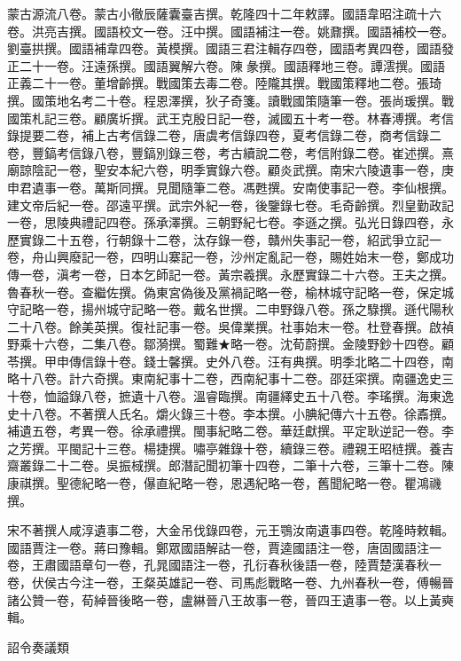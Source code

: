 \begin{pinyinscope}
蒙古源流八卷。蒙古小徹辰薩囊臺吉撰。乾隆四十二年敕譯。國語韋昭注疏十六卷。洪亮吉撰。國語校文一卷。汪中撰。國語補注一卷。姚鼐撰。國語補校一卷。劉臺拱撰。國語補韋四卷。黃模撰。國語三君注輯存四卷，國語考異四卷，國語發正二十一卷。汪遠孫撰。國語翼解六卷。陳彖撰。國語釋地三卷。譚澐撰。國語正義二十一卷。董增齡撰。戰國策去毒二卷。陸隴其撰。戰國策釋地二卷。張琦撰。國策地名考二十卷。程恩澤撰，狄子奇箋。讀戰國策隨筆一卷。張尚瑗撰。戰國策札記三卷。顧廣圻撰。武王克殷日記一卷，滅國五十考一卷。林春溥撰。考信錄提要二卷，補上古考信錄二卷，唐虞考信錄四卷，夏考信錄二卷，商考信錄二卷，豐鎬考信錄八卷，豐鎬別錄三卷，考古續說二卷，考信附錄二卷。崔述撰。熹廟諒陰記一卷，聖安本紀六卷，明季實錄六卷。顧炎武撰。南宋六陵遺事一卷，庚申君遺事一卷。萬斯同撰。見聞隨筆二卷。馮甦撰。安南使事記一卷。李仙根撰。建文帝后紀一卷。邵遠平撰。武宗外紀一卷，後鑒錄七卷。毛奇齡撰。烈皇勤政記一卷，思陵典禮記四卷。孫承澤撰。三朝野紀七卷。李遜之撰。弘光日錄四卷，永歷實錄二十五卷，行朝錄十二卷，汰存錄一卷，贛州失事記一卷，紹武爭立記一卷，舟山興廢記一卷，四明山寨記一卷，沙州定亂記一卷，賜姓始末一卷，鄭成功傳一卷，滇考一卷，日本乞師記一卷。黃宗羲撰。永歷實錄二十六卷。王夫之撰。魯春秋一卷。查繼佐撰。偽東宮偽後及黨禍記略一卷，榆林城守記略一卷，保定城守記略一卷，揚州城守記略一卷。戴名世撰。二申野錄八卷。孫之騄撰。遜代陽秋二十八卷。餘美英撰。復社記事一卷。吳偉業撰。社事始末一卷。杜登春撰。啟禎野乘十六卷，二集八卷。鄒漪撰。蜀難★略一卷。沈荀蔚撰。金陵野鈔十四卷。顧苓撰。甲申傳信錄十卷。錢士馨撰。史外八卷。汪有典撰。明季北略二十四卷，南略十八卷。計六奇撰。東南紀事十二卷，西南紀事十二卷。邵廷寀撰。南疆逸史三十卷，恤謚錄八卷，摭遺十八卷。溫睿臨撰。南疆繹史五十八卷。李瑤撰。海東逸史十八卷。不著撰人氏名。爝火錄三十卷。李本撰。小腆紀傳六十五卷。徐鼒撰。補遺五卷，考異一卷。徐承禮撰。閩事紀略二卷。華廷獻撰。平定耿逆記一卷。李之芳撰。平閩記十三卷。楊捷撰。嘯亭雜錄十卷，續錄三卷。禮親王昭梿撰。養吉齋叢錄二十二卷。吳振棫撰。郎潛記聞初筆十四卷，二筆十六卷，三筆十二卷。陳康祺撰。聖德紀略一卷，儤直紀略一卷，恩遇紀略一卷，舊聞紀略一卷。瞿鴻禨撰。

宋不著撰人咸淳遺事二卷，大金吊伐錄四卷，元王鶚汝南遺事四卷。乾隆時敕輯。國語賈注一卷。蔣曰豫輯。鄭眾國語解詁一卷，賈逵國語注一卷，唐固國語注一卷，王肅國語章句一卷，孔晁國語注一卷，孔衍春秋後語一卷，陸賈楚漢春秋一卷，伏侯古今注一卷，王粲英雄記一卷、司馬彪戰略一卷、九州春秋一卷，傅暢晉諸公贊一卷，荀綽晉後略一卷，盧綝晉八王故事一卷，晉四王遺事一卷。以上黃奭輯。

詔令奏議類


\end{pinyinscope}
